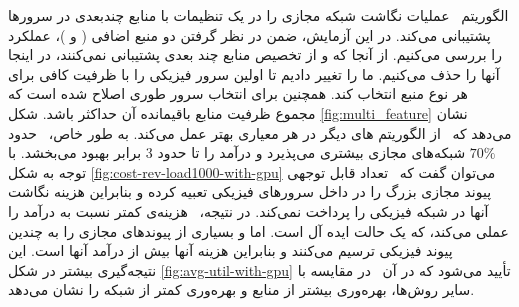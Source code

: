   الگوریتم \ourAlg\ عملیات نگاشت شبکه مجازی را در یک تنظیمات با منابع چندبعدی در سرور‌ها پشتیبانی می‌کند. در این آزمایش‌، ضمن در نظر گرفتن دو منبع اضافی (  و )‌، عملکرد \ourAlg\ را بررسی می‌کنیم. از آنجا که  و  از تخصیص منابع چند بعدی پشتیبانی نمی‌کنند‌، در اینجا آنها را حذف می‌کنیم. ما   را تغییر دادیم تا اولین سرور فیزیکی را با ظرفیت کافی برای هر نوع منبع انتخاب کند. همچنین   برای انتخاب سرور طوری اصلاح شده است که مجموع ظرفیت منابع باقیمانده آن حداکثر باشد. شکل 
  \ref {fig:multi_feature} 
  نشان می‌دهد که \ourAlg\ از الگوریتم های دیگر در هر معیاری بهتر عمل می‌کند. به طور خاص‌، \ourAlg\ حدود $70\%$  شبکه‌های مجازی بیشتری می‌پذیرد و درآمد را تا حدود $ 3 $ برابر بهبود می‌بخشد. با توجه به شکل
  \ref {fig:cost-rev-load1000-with-gpu}
   می‌توان گفت که  \ourAlg\ تعداد قابل توجهی پیوند مجازی بزرگ را در داخل سرورهای فیزیکی تعبیه کرده و بنابراین هزینه نگاشت آنها در شبکه فیزیکی را پرداخت نمی‌کند. در نتیجه‌، \ourAlg\ هزینه‌ی کمتر نسبت به درآمد را عملی می‌کند‌، که یک حالت ایده آل است. اما  و  بسیاری از پیوندهای مجازی را به چندین پیوند فیزیکی ترسیم می‌کنند و بنابراین هزینه آنها بیش از درآمد آنها است. این نتیجه‌گیری بیشتر در شکل
    \ref{fig:avg-util-with-gpu} 
    تأیید می‌شود که در آن \ourAlg\ در مقایسه با سایر روش‌ها‌، بهره‌وری بیشتر از منابع و بهره‌وری کمتر از شبکه را نشان می‌دهد. 
      
     
    
